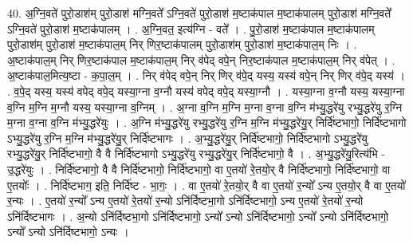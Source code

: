 \documentclass[17pt]{extarticle}
\begin{document}
40. अ॒ग्नि॒वते॑ पुरो॒डाश॑म् पुरो॒डाश॑ मग्नि॒वते᳚ ऽग्नि॒वते॑ पुरो॒डाश॑ म॒ष्टाक॑पाल म॒ष्टाक॑पालम् पुरो॒डाश॑ मग्नि॒वते᳚ ऽग्नि॒वते॑ पुरो॒डाश॑ म॒ष्टाक॑पालम् । . अ॒ग्नि॒वत॒ इत्य॑ग्नि - वते᳚ । . पु॒रो॒डाश॑ म॒ष्टाक॑पाल म॒ष्टाक॑पालम् पुरो॒डाश॑म् पुरो॒डाश॑ म॒ष्टाक॑पाल॒म् निर् णिर॒ष्टाक॑पालम् पुरो॒डाश॑म् पुरो॒डाश॑ म॒ष्टाक॑पाल॒म् निः । . अ॒ष्टाक॑पाल॒म् निर् णिर॒ष्टाक॑पाल म॒ष्टाक॑पाल॒म् निर् व॑पेद् वपे॒न् निर॒ष्टाक॑पाल म॒ष्टाक॑पाल॒म् निर् व॑पेत् । . अ॒ष्टाक॑पाल॒मित्य॒ष्टा - क॒पा॒ल॒म् । . निर् व॑पेद् वपे॒न् निर् णिर् व॑पे॒द् यस्य॒ यस्य॑ वपे॒न् निर् णिर् व॑पे॒द् यस्य॑ । . व॒पे॒द् यस्य॒ यस्य॑ वपेद् वपे॒द् यस्या॒ग्ना व॒ग्नौ यस्य॑ वपेद् वपे॒द् यस्या॒ग्नौ । . यस्या॒ग्ना व॒ग्नौ यस्य॒ यस्या॒ग्ना व॒ग्नि म॒ग्नि म॒ग्नौ यस्य॒ यस्या॒ग्ना व॒ग्निम् । . अ॒ग्ना व॒ग्नि म॒ग्नि म॒ग्ना व॒ग्ना व॒ग्नि म॑भ्यु॒द्धरे॑यु रभ्यु॒द्धरे॑यु र॒ग्नि म॒ग्ना व॒ग्ना व॒ग्नि म॑भ्यु॒द्धरे॑युः । . अ॒ग्नि म॑भ्यु॒द्धरे॑यु रभ्यु॒द्धरे॑यु र॒ग्नि म॒ग्नि म॑भ्यु॒द्धरे॑यु॒र् निर्दि॑ष्टभागो॒ निर्दि॑ष्टभागो ऽभ्यु॒द्धरे॑यु र॒ग्नि म॒ग्नि म॑भ्यु॒द्धरे॑यु॒र् निर्दि॑ष्टभागः । . अ॒भ्यु॒द्धरे॑यु॒र् निर्दि॑ष्टभागो॒ निर्दि॑ष्टभागो ऽभ्यु॒द्धरे॑यु रभ्यु॒द्धरे॑यु॒र् निर्दि॑ष्टभागो॒ वै वै निर्दि॑ष्टभागो ऽभ्यु॒द्धरे॑यु रभ्यु॒द्धरे॑यु॒र् निर्दि॑ष्टभागो॒ वै । . अ॒भ्यु॒द्धरे॑यु॒रित्य॑भि - उ॒द्धरे॑युः । . निर्दि॑ष्टभागो॒ वै वै निर्दि॑ष्टभागो॒ निर्दि॑ष्टभागो॒ वा ए॒तयो॑ रे॒तयो॒र् वै निर्दि॑ष्टभागो॒ निर्दि॑ष्टभागो॒ वा ए॒तयोः᳚ । . निर्दि॑ष्टभाग॒ इति॒ निर्दि॑ष्ट - भा॒गः॒ । . वा ए॒तयो॑ रे॒तयो॒र् वै वा ए॒तयो॑ र॒न्यो᳚ ऽन्य ए॒तयो॒र् वै वा ए॒तयो॑ र॒न्यः । . ए॒तयो॑ र॒न्यो᳚ ऽन्य ए॒तयो॑ रे॒तयो॑ र॒न्यो ऽनि॑र्दिष्टभा॒गो ऽनि॑र्दिष्टभागो॒ ऽन्य ए॒तयो॑ रे॒तयो॑ र॒न्यो ऽनि॑र्दिष्टभागः । . अ॒न्यो ऽनि॑र्दिष्टभा॒गो ऽनि॑र्दिष्टभागो॒ ऽन्यो᳚ ऽन्यो ऽनि॑र्दिष्टभागो॒ ऽन्यो᳚ ऽन्यो ऽनि॑र्दिष्टभागो॒ ऽन्यो᳚ ऽन्यो ऽनि॑र्दिष्टभागो॒ ऽन्यः । \newline
\end{document}
